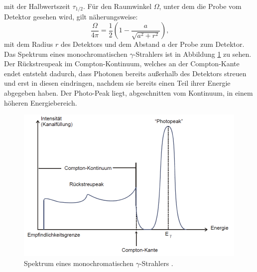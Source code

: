 mit der Halbwertszeit $\tau_{1/2}$.
Für den Raumwinkel $\Omega$, unter dem die Probe vom Detektor gesehen wird, gilt näherungsweise:
\begin{equation}
\frac{\Omega}{4\pi} = \frac{1}{2}\left(1-\frac{a}{\sqrt{a^2+r^2}}\right)\text{,}\label{eq:Omega}
\end{equation}
mit dem Radius $r$ des Detektors und dem Abstand $a$ der Probe zum Detektor.\newpage
\noindent Das Spektrum eines monochromatischen $\gamma$-Strahlers ist in Abbildung \ref{fig:Spektrum} zu sehen.
Der Rückstreupeak im Compton-Kontinuum, welches an der Compton-Kante endet entsteht dadurch, dass Photonen bereits außerhalb des Detektors streuen und erst in diesen eindringen, nachdem sie bereits einen Teil ihrer Energie abgegeben haben. Der Photo-Peak liegt, abgeschnitten vom Kontinuum, in einem höheren Energiebereich.
\begin{figure}
	\centering
	\includegraphics[width=\linewidth-70pt,height=\textheight-70pt,keepaspectratio]{content/images/Spektrum.pdf}
	\caption{Spektrum eines monochromatischen $\gamma$-Strahlers \cite{V18}.}
	\label{fig:Spektrum}
\end{figure}

